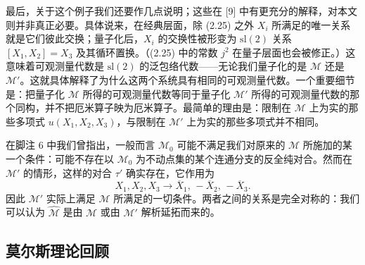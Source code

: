 \documentclass[11pt,a4paper,UTF8]{ctexart}
\theoremstyle{plain}
\theoremstyle{definition}
\begin{document}


最后，关于这个例子我们还要作几点说明；这些在 [9] 中有更充分的解释，对本文则并非真正必要。具体说来，在经典层面，除 (2.25) 之外 $X_i$ 所满足的唯一关系就是它们彼此交换；量子化后，$X_i$ 的交换性被形变为 $\mathrm{sl}(2)$ 关系 $[X_1,X_2]=X_3$ 及其循环置换。（(2.25) 中的常数 $j^2$ 在量子层面也会被修正。）这意味着可观测量代数是 $\mathrm{sl}(2)$ 的泛包络代数——无论我们量子化的是 $\mathcal M$ 还是 $\mathcal M'$。这就具体解释了为什么这两个系统具有相同的可观测量代数。一个重要细节是：把量子化 $\mathcal M$ 所得的可观测量代数等同于量子化 $\mathcal M'$ 所得的可观测量代数的那个同构，并不把厄米算子映为厄米算子。最简单的理由是：限制在 $\mathcal M$ 上为实的那些多项式 $u(X_1,X_2,X_3)$，与限制在 $\mathcal M'$ 上为实的那些多项式并不相同。

在脚注 6 中我们曾指出，一般而言 $\mathcal M_0$ 可能不满足我们对原来的 $\mathcal M$ 所施加的某一个条件：可能不存在以 $\mathcal M_0$ 为不动点集的某个连通分支的反全纯对合。然而在 $\mathcal M'$ 的情形，这样的对合 $\tau'$ 确实存在，它作用为
\[
    X_1,X_2,X_3\to\overline{X}_1,\,-\overline{X}_2,\,-\overline{X}_3 .
\]
因此 $\mathcal M'$ 实际上满足 $\mathcal M$ 所满足的一切条件。两者之间的关系是完全对称的：我们可以认为 $\widehat{\mathcal M}$ 是由 $\mathcal M$ 或由 $\mathcal M'$ 解析延拓而来的。


\subsection{莫尔斯理论回顾}
\end{document}
